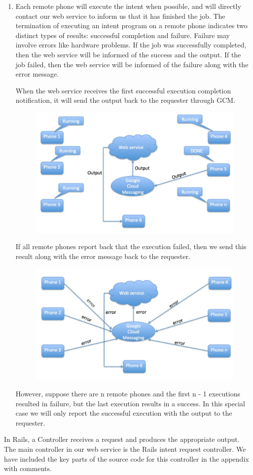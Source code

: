 \documentclass{acm_proc_article-sp}
\begin{document}
\begin{enumerate}
\item Each remote phone will execute the intent when possible, and
  will directly contact our web service to inform us that it has
  finished the job.  The termination of executing an intent program on
  a remote phone indicates two distinct types of results: successful
  completion and failure.  Failure may involve errors like hardware
  problems.  If the job was successfully completed, then the web
  service will be informed of the success and the output.  If the job
  failed, then the web service will be informed of the failure along
  with the error message.

  When the web service receives the first successful execution
  completion notification, it will send the output back to the
  requester through GCM.

\begin{figure}[h]
  \centering
  \includegraphics[width=.4\textwidth]{s4a.jpg}
\end{figure}

If all remote phones report back that the execution failed, then we send this result along with the error message back to the requester.

\begin{figure}[h]
  \centering
  \includegraphics[width=.4\textwidth]{s4b.jpg}
\end{figure}

However, suppose there are n remote phones and the first n - 1
executions resulted in failure, but the last execution results in a
success.  In this special case we will only report the successful
execution with the output to the requester.

\end{enumerate}

In Rails, a Controller receives a request and produces the appropriate output. 
The main controller in our web service is the Rails intent request controller. 
We have included the key parts of the source code for this controller in the 
appendix with comments.
\end{document}
